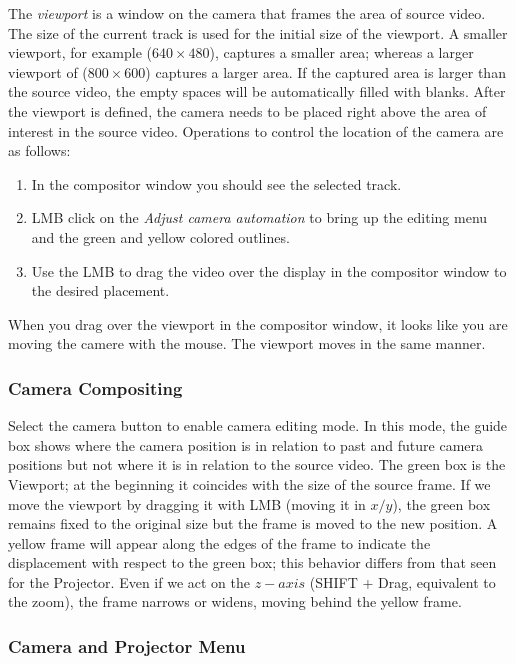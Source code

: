 The \textit{viewport} is a window on the camera that frames the area of source video. The size of
the current track is used for the initial size of the viewport. A smaller viewport, for example
($640\times480$), captures a smaller area; whereas a larger viewport of ($800\times600$) captures
a larger area.  If the captured area is larger than the source video, the empty spaces will be
automatically filled with blanks.  After the viewport is defined, the camera needs to be placed
right above the area of interest in the source video. Operations to control the location of the
camera are as follows:

\begin{enumerate}
    \item  In the compositor window you should see the selected track.
    \item  LMB click on the \textit{Adjust camera automation} to bring up the editing menu and the 
green and yellow colored outlines.
    \item  Use the LMB to drag the video over the display in the compositor window to the desired
placement.
\end{enumerate}

When you drag over the viewport in the compositor window, it looks like you are moving the camere
with the mouse.  The viewport moves in the same manner.

\subsubsection*{Camera Compositing}%
\label{ssub:camera_compositing}

Select the camera button to enable camera editing mode. 
In this mode, the guide box shows where the camera position is in relation to past and future camera positions but not where it is in relation to the source video. 
The green box is the Viewport; at the beginning it coincides with the size of the source frame. If we move the viewport by dragging it with LMB (moving it in $x/y$), the green box remains fixed to the original size but the frame is moved to the new position.  A yellow frame will appear along the edges of the frame to indicate the displacement with respect to the green box; this behavior differs from that seen for the Projector. Even if we act on the $z-axis$ (SHIFT + Drag, equivalent to the zoom), the frame narrows or widens, moving behind the yellow frame.

\subsubsection*{Camera and Projector Menu}%
\label{ssub:camera_and_projector_menu}

